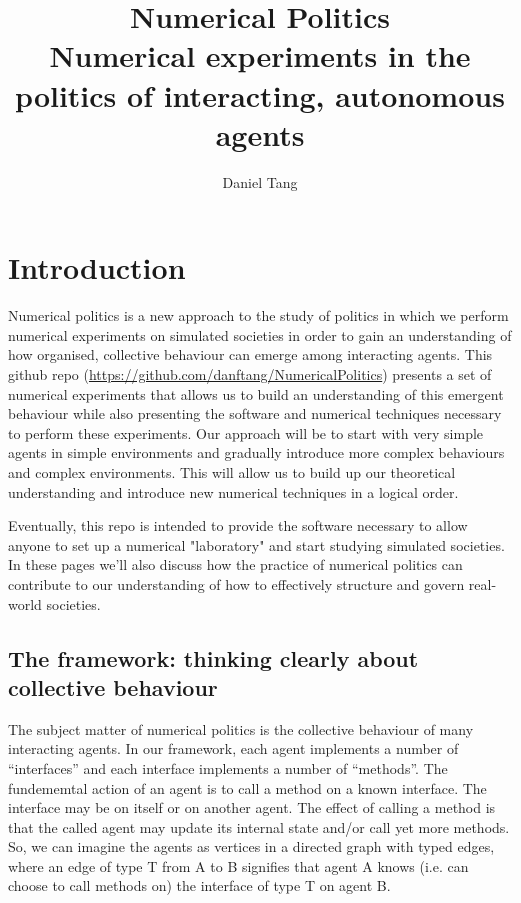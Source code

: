 \documentclass[a4paper]{report}
\title{Numerical Politics\\
	\large Numerical experiments in the politics of interacting, autonomous agents}
\author{Daniel Tang}
\begin{document}
\maketitle

\chapter{Introduction}

Numerical politics is a new approach to the study of politics in which we perform numerical experiments on simulated societies in order to gain an understanding of how organised, collective behaviour can emerge among interacting agents. This github repo (\url{https://github.com/danftang/NumericalPolitics}) presents a set of numerical experiments  that allows us to build an understanding of this emergent behaviour while also presenting the software and numerical techniques necessary to perform these experiments. Our approach will be to start with very simple agents in simple environments and gradually introduce more complex behaviours and complex environments. This will allow us to build up our theoretical understanding and introduce new numerical techniques in a logical order.

Eventually, this repo is intended to provide the software necessary to allow anyone to set up a numerical "laboratory" and start studying simulated societies. In these pages we'll also discuss how the practice of numerical politics can contribute to our understanding of how to effectively structure and govern real-world societies.

\section{The framework: thinking clearly about collective behaviour}

The subject matter of numerical politics is the collective behaviour of many interacting agents. In our framework, each agent implements a number of ``interfaces'' and each interface implements a number of ``methods''. The fundememtal action of an agent is to call a method on a known interface. The interface may be on itself or on another agent. The effect of calling a method is that the called agent may update its internal state and/or call yet more methods. So, we can imagine the agents as vertices in a directed graph with typed edges, where an edge of type T from A to B signifies that agent A knows (i.e. can choose to call methods on) the interface of type T on agent B. 
\end{document}
